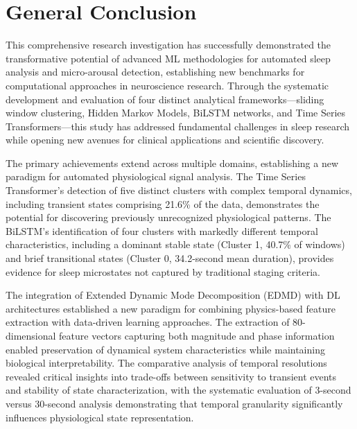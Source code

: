 \documentclass[a4paper,12pt,twoside]{article}
\begin{document}

\onehalfspacing
\section*{General Conclusion}

This comprehensive research investigation has successfully demonstrated the transformative potential of advanced ML methodologies for automated sleep analysis and micro-arousal detection, establishing new benchmarks for computational approaches in neuroscience research. Through the systematic development and evaluation of four distinct analytical frameworks—sliding window clustering, Hidden Markov Models, BiLSTM networks, and Time Series Transformers—this study has addressed fundamental challenges in sleep research while opening new avenues for clinical applications and scientific discovery.

The primary achievements extend across multiple domains, establishing a new paradigm for automated physiological signal analysis. The Time Series Transformer's detection of five distinct clusters with complex temporal dynamics, including transient states comprising 21.6\% of the data, demonstrates the potential for discovering previously unrecognized physiological patterns. The BiLSTM's identification of four clusters with markedly different temporal characteristics, including a dominant stable state (Cluster 1, 40.7\% of windows) and brief transitional states (Cluster 0, 34.2-second mean duration), provides evidence for sleep microstates not captured by traditional staging criteria.

The integration of Extended Dynamic Mode Decomposition (EDMD) with DL architectures established a new paradigm for combining physics-based feature extraction with data-driven learning approaches. The extraction of 80-dimensional feature vectors capturing both magnitude and phase information enabled preservation of dynamical system characteristics while maintaining biological interpretability. The comparative analysis of temporal resolutions revealed critical insights into trade-offs between sensitivity to transient events and stability of state characterization, with the systematic evaluation of 3-second versus 30-second analysis demonstrating that temporal granularity significantly influences physiological state representation.
\end{document}
